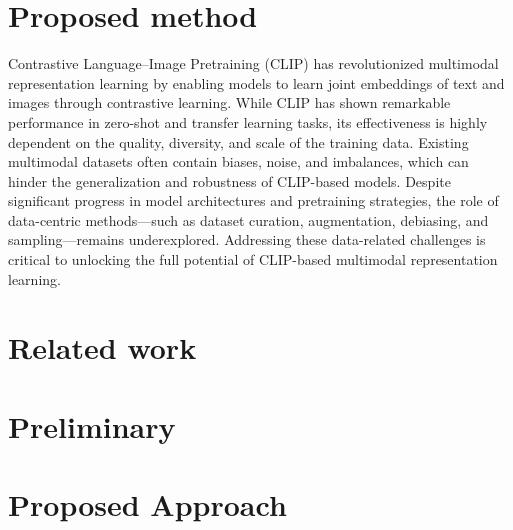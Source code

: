 \documentclass[11pt,letterpaper]{article}
\begin{document}
\section{Proposed method}
Contrastive Language–Image Pretraining (CLIP) has revolutionized multimodal representation learning by enabling models to learn joint embeddings of text and images through contrastive learning. While CLIP has shown remarkable performance in zero-shot and transfer learning tasks, its effectiveness is highly dependent on the quality, diversity, and scale of the training data. Existing multimodal datasets often contain biases, noise, and imbalances, which can hinder the generalization and robustness of CLIP-based models. Despite significant progress in model architectures and pretraining strategies, the role of data-centric methods—such as dataset curation, augmentation, debiasing, and sampling—remains underexplored. Addressing these data-related challenges is critical to unlocking the full potential of CLIP-based multimodal representation learning.



\section{Related work} 




\section{Preliminary}












\section{Proposed Approach}


















\printbibliography
\end{document}
